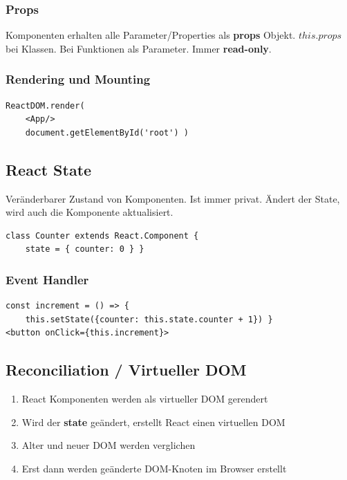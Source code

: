 \endgroup


\subsubsection{Props}
Komponenten erhalten alle Parameter/Properties als \textbf{props} Objekt.
$this.props$ bei Klassen.
Bei Funktionen als Parameter.
Immer \textbf{read-only}.

\subsubsection{Rendering und Mounting}
\begin{lstlisting}
ReactDOM.render(
    <App/>
    document.getElementById('root') )
\end{lstlisting}

\subsection{React State}
Veränderbarer Zustand von Komponenten.
Ist immer privat.
Ändert der State, wird auch die Komponente aktualisiert.
\begin{lstlisting}
class Counter extends React.Component {
    state = { counter: 0 } }
\end{lstlisting}

\subsubsection{Event Handler}
\begin{lstlisting}
const increment = () => {
    this.setState({counter: this.state.counter + 1}) }
<button onClick={this.increment}>
\end{lstlisting}

\subsection{Reconciliation / Virtueller DOM}
\begin{enumerate}
    \item React Komponenten werden als virtueller DOM gerendert
    \item Wird der \textbf{state} geändert, erstellt React einen virtuellen DOM
    \item Alter und neuer DOM werden verglichen
    \item Erst dann werden geänderte DOM-Knoten im Browser erstellt
\end{enumerate}

